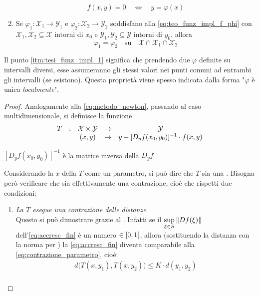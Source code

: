 \begin{theorem}
\begin{enumerate}
			\begin{equation}
				\label{eq:teo_funz_impl_f_phi}
				f(x,y) = 0 \quad \iff \quad y = \varphi(x)
			\end{equation}
		\item \label{itm:tesi_funz_impl_1} Se $\varphi_1: \mathcal{X}_1 \to \mathcal{Y}_1$ e $\varphi_2: \mathcal{X}_2 \to \mathcal{Y}_2$ soddisfano alla \cref{eq:teo_funz_impl_f_phi} con $\mathcal{X}_1, \mathcal{X}_2 \subseteq \mathcal{X}$ intorni di $x_0$ e $\mathcal{Y}_1, \mathcal{Y}_2 \subseteq \mathcal{Y}$ intorni di $y_0$, allora
			\[\varphi_1 = \varphi_2 \quad \text{su} \quad \mathcal{X} \cap \mathcal{X}_1 \cap \mathcal{X}_2\]
	\end{enumerate}
	\begin{note}
		Il punto \ref{itm:tesi_funz_impl_1} significa che prendendo due $\varphi$ definite su intervalli diversi, esse assumeranno gli stessi valori nei punti comuni ad entrambi gli intervalli (se esistono). Questa proprietà viene spesso indicata dalla forma "$\varphi$ è unica \textit{localmente}".
	\end{note}
	\begin{proof}
		Analogamente alla \cref{eq:metodo_newton}, passando al caso multidimensionale, si definisce la funzione
		\begin{equation}
			\label{teo:funz_impl_T}
			\begin{array}{ccccc} {T} & : & {\mathcal{X} \times \mathcal{Y}} & \to & {\mathcal{Y}} \\ & & {(x,y)} & \mapsto & {y - [D_yf(x_0, y_0)]^{-1} \cdot f(x, y)} \\ \end{array}
		\end{equation}
		\begin{note}
			$[D_yf(x_0, y_0)]^{-1}$ è la matrice inversa della $D_yf$
		\end{note}
		Considerando la $x$ della $T$ come un parametro, si può dire che $T$ sia una . Bisogna però verificare che sia effettivamente una contrazione, cioè che rispetti due condizioni:
		\begin{enumerate}
			\item \textit{La $T$ esegue una contrazione delle distanze}\\
				Questo si può dimostrare grazie al . Infatti se il $\sup\limits_{\xi \in S} \left\|Df(\xi)\right\|$ dell'\cref{eq:accresc_fin} è un numero $\in \left[0,1\right[$, allora (sostituendo la distanza con la norma per ) la \cref{eq:accresc_fin} diventa comparabile alla \cref{eq:contrazione_parametro}, cioè:
				\[
					\begin{gathered}
						d \bigl( T(x, y_1), T(x, y_2) \bigr) \leq K \cdot d(y_1, y_2)\\

\end{gathered}\]
\end{enumerate}
\end{proof}
\end{theorem}
